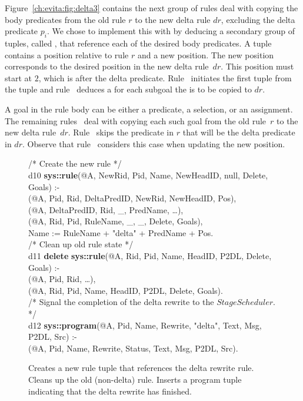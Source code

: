 Figure~\ref{ch:evita:fig:delta3} contains the next group of rules deal with
copying the body predicates from the old rule $r$ to the new delta rule $dr$,
excluding the delta predicate $p_i$.  We chose to implement this with by
deducing a secondary group of tuples, called , that reference
each of the desired body predicates.  A  tuple contains a
position relative to rule $r$ and a new position.  The new position corresponds
to the desired position in the new delta rule~$dr$.  This position must start
at $2$, which is after the delta predicate.  Rule~ initiates the first
 tuple from the  tuple and rule~ deduces a
 for each subgoal the is to be copied to $dr$.


A goal in the rule body can be either a predicate, a selection, or an
assignment.  The remaining rules~ deal with copying each such
goal from the old rule~$r$ to the new delta rule~$dr$.  Rule~ skips the
predicate in $r$ that will be the delta predicate in $dr$.  Observe that
rule~ considers this case when updating the new position.

\begin{figure}[!t]
\ssp
\centering
\begin{boxedminipage}{\linewidth}
/* Create the new rule */ \\
d10 {\bf sys::rule}(@A, NewRid, Pid, Name, NewHeadID, null, Delete, Goals) :- \\
(@A, Pid, Rid, DeltaPredID, NewRid, NewHeadID, Pos), \\
(@A, DeltaPredID, Rid, \_, PredName, \ldots), \\
(@A, Rid, Pid, RuleName, \_, \_, Delete, Goals), \\
\datalogspace Name := RuleName + "delta" + PredName + Pos. \\

/* Clean up old rule state */ \\
d11 {\bf delete} {\bf sys::rule}(@A, Rid, Pid, Name, HeadID, P2DL, Delete, Goals) :- \\
(@A, Pid, Rid, \ldots),  \\
(@A, Rid, Pid, Name, HeadID, P2DL, Delete, Goals). \\
  
/* Signal the completion of the delta rewrite to the $StageScheduler$. */ \\
d12 {\bf sys::program}(@A, Pid, Name, Rewrite, "delta", Text, Msg, P2DL, Src) :- \\
(@A, Pid, Name, Rewrite, Status, Text, Msg, P2DL, Src).

\end{boxedminipage}
\caption{\label{ch:evita:fig:delta4}Creates a new rule tuple that references the delta 
rewrite rule. Cleans up the old (non-delta) rule. Inserts a program tuple indicating
that the delta rewrite has finished. }
\end{figure}

